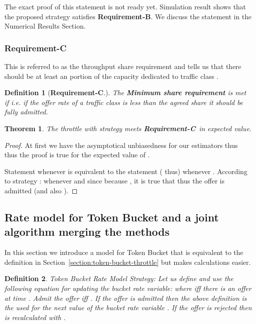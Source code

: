 \documentclass[conference]{IEEEtran}
\newtheorem{theorem}{Theorem}
\newtheorem{definition}{Definition}
\newcommand{\reqB}{\textbf{Requirement-B}}
\newcommand{\reqC}{\textbf{Requirement-C}}
\begin{document}
The exact proof of this statement is not ready yet. Simulation
result shows that the proposed strategy satisfies \reqB. We discuss
the statement in the Numerical Results Section.

\subsubsection{Requirement-C}
This is referred to as the throughput share requirement and tells us
that there should be at least an  portion of the capacity
dedicated to traffic class .

\begin{definition}[\reqC.] The \textbf{Minimum share
requirement} is met if  i.e. if the offer rate
of a traffic class is less than the agreed share it should be fully
admitted.
\end{definition}

\begin{theorem}
The throttle with strategy  meets \reqC\ in expected
value.
\end{theorem}

\begin{proof} At first we have the asymptotical unbiasedness for our estimators thus
 thus the proof is true for the
expected value of .

Statement  whenever  is equivalent to the statement
( thus)  whenever . According
to strategy :  whenever
 and since
 because
, it is true that
 thus the offer is admitted (and
also ).\end{proof}

\subsection{Rate model for Token Bucket and a joint algorithm merging the
methods}\label{section:token-bucket-rate-model-class-handling} In
this section we introduce a model for Token Bucket that is
equivalent to the definition in
Section~\ref{section:token-bucket-throttle} but makes calculations
easier.

\begin{definition}
Token Bucket Rate Model Strategy:  Let us
define  and use the following equation for updating the
bucket rate variable:
 where  iff there is an offer at time . Admit the offer iff
. If the offer is admitted then the above
definition is the used for the next value of the bucket rate
variable . If the offer is rejected then
 is recalculated with .
\end{definition}
\end{document}
